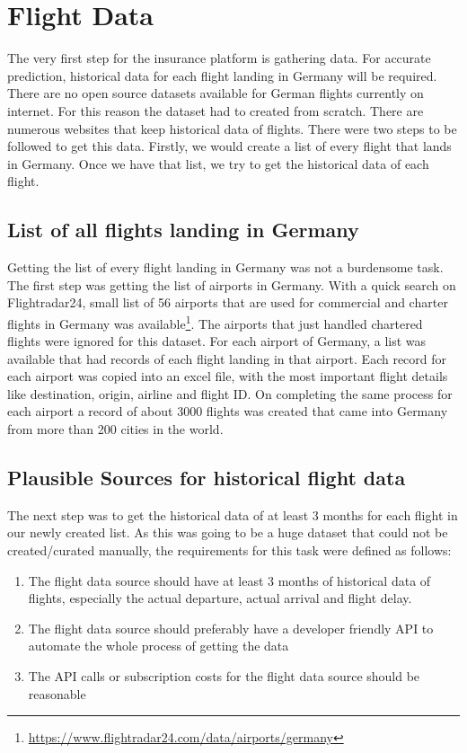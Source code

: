 \chapter{Flight Data}
The very first step for the insurance platform is gathering data. For accurate prediction, historical data for each flight landing in Germany will be required. There are no open source datasets available for German flights currently on internet. For this reason the dataset had to created from scratch. There are numerous websites that keep historical data of flights. There were two steps to be followed to get this data. Firstly, we would create a list of every flight that lands in Germany. Once we have that list, we try to get the historical data of each flight.

\section{List of all flights landing in Germany}
Getting the list of every flight landing in Germany was not a burdensome task. The first step was getting the list of airports in Germany. With a quick search on Flightradar24, small list of 56 airports that are used for commercial and charter flights in Germany was available\footnote{\url{https://www.flightradar24.com/data/airports/germany}}. The airports that just handled chartered flights were ignored for this dataset. For each airport of Germany, a list was available that had records of each flight landing in that airport. Each record for each airport was copied into an excel file, with the most important flight details like destination, origin, airline and flight ID. On completing the same process for each airport a record of about 3000 flights was created that came into Germany from more than 200 cities in the world.

\section{Plausible Sources for historical flight data}
The next step was to get the historical data of at least 3 months for each flight in our newly created list. As this was going to be a huge dataset that could not be created/curated manually, the requirements for this task were defined as follows:
\begin{enumerate}
    \item The flight data source should have at least 3 months of historical data of flights, especially the actual departure, actual arrival and flight delay.
    \item The flight data source should preferably have a developer friendly API to automate the whole process of getting the data
    \item The API calls or subscription costs for the flight data source should be reasonable
\end{enumerate}

